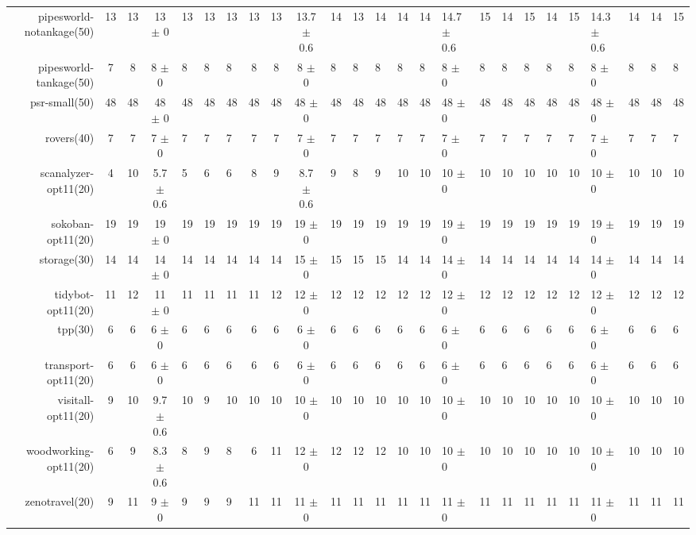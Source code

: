 \begin{center}
\begin{tabular}{|rcccHHH|cccHHHHHHHHHHHHHHH|}
pipesworld-notankage(50) & 13 & 13 & 13 \(\pm\) 0 & 13 & 13 & 13 & 13 & 13 & 13.7 \(\pm\) 0.6 & 14 & 13 & 14 & 14 & 14 & 14.7 \(\pm\) 0.6 & 15 & 14 & 15 & 14 & 15 & 14.3 \(\pm\) 0.6 & 14 & 14 & 15\\
pipesworld-tankage(50) & 7 & 8 & 8 \(\pm\) 0 & 8 & 8 & 8 & 8 & 8 & 8 \(\pm\) 0 & 8 & 8 & 8 & 8 & 8 & 8 \(\pm\) 0 & 8 & 8 & 8 & 8 & 8 & 8 \(\pm\) 0 & 8 & 8 & 8\\
psr-small(50) & 48 & 48 & 48 \(\pm\) 0 & 48 & 48 & 48 & 48 & 48 & 48 \(\pm\) 0 & 48 & 48 & 48 & 48 & 48 & 48 \(\pm\) 0 & 48 & 48 & 48 & 48 & 48 & 48 \(\pm\) 0 & 48 & 48 & 48\\
rovers(40) & 7 & 7 & 7 \(\pm\) 0 & 7 & 7 & 7 & 7 & 7 & 7 \(\pm\) 0 & 7 & 7 & 7 & 7 & 7 & 7 \(\pm\) 0 & 7 & 7 & 7 & 7 & 7 & 7 \(\pm\) 0 & 7 & 7 & 7\\
scanalyzer-opt11(20) & 4 & 10 & 5.7 \(\pm\) 0.6 & 5 & 6 & 6 & 8 & 9 & 8.7 \(\pm\) 0.6 & 9 & 8 & 9 & 10 & 10 & 10 \(\pm\) 0 & 10 & 10 & 10 & 10 & 10 & 10 \(\pm\) 0 & 10 & 10 & 10\\
sokoban-opt11(20) & 19 & 19 & 19 \(\pm\) 0 & 19 & 19 & 19 & 19 & 19 & 19 \(\pm\) 0 & 19 & 19 & 19 & 19 & 19 & 19 \(\pm\) 0 & 19 & 19 & 19 & 19 & 19 & 19 \(\pm\) 0 & 19 & 19 & 19\\
storage(30) & 14 & 14 & 14 \(\pm\) 0 & 14 & 14 & 14 & 14 & 14 & 15 \(\pm\) 0 & 15 & 15 & 15 & 14 & 14 & 14 \(\pm\) 0 & 14 & 14 & 14 & 14 & 14 & 14 \(\pm\) 0 & 14 & 14 & 14\\
tidybot-opt11(20) & 11 & 12 & 11 \(\pm\) 0 & 11 & 11 & 11 & 11 & 12 & 12 \(\pm\) 0 & 12 & 12 & 12 & 12 & 12 & 12 \(\pm\) 0 & 12 & 12 & 12 & 12 & 12 & 12 \(\pm\) 0 & 12 & 12 & 12\\
tpp(30) & 6 & 6 & 6 \(\pm\) 0 & 6 & 6 & 6 & 6 & 6 & 6 \(\pm\) 0 & 6 & 6 & 6 & 6 & 6 & 6 \(\pm\) 0 & 6 & 6 & 6 & 6 & 6 & 6 \(\pm\) 0 & 6 & 6 & 6\\
transport-opt11(20) & 6 & 6 & 6 \(\pm\) 0 & 6 & 6 & 6 & 6 & 6 & 6 \(\pm\) 0 & 6 & 6 & 6 & 6 & 6 & 6 \(\pm\) 0 & 6 & 6 & 6 & 6 & 6 & 6 \(\pm\) 0 & 6 & 6 & 6\\
visitall-opt11(20) & 9 & 10 & 9.7 \(\pm\) 0.6 & 10 & 9 & 10 & 10 & 10 & 10 \(\pm\) 0 & 10 & 10 & 10 & 10 & 10 & 10 \(\pm\) 0 & 10 & 10 & 10 & 10 & 10 & 10 \(\pm\) 0 & 10 & 10 & 10\\
woodworking-opt11(20) & 6 & 9 & 8.3 \(\pm\) 0.6 & 8 & 9 & 8 & 6 & 11 & 12 \(\pm\) 0 & 12 & 12 & 12 & 10 & 10 & 10 \(\pm\) 0 & 10 & 10 & 10 & 10 & 10 & 10 \(\pm\) 0 & 10 & 10 & 10\\
zenotravel(20) & 9 & 11 & 9 \(\pm\) 0 & 9 & 9 & 9 & 11 & 11 & 11 \(\pm\) 0 & 11 & 11 & 11 & 11 & 11 & 11 \(\pm\) 0 & 11 & 11 & 11 & 11 & 11 & 11 \(\pm\) 0 & 11 & 11 & 11\\
\hline
\end{tabular}
\end{center}
